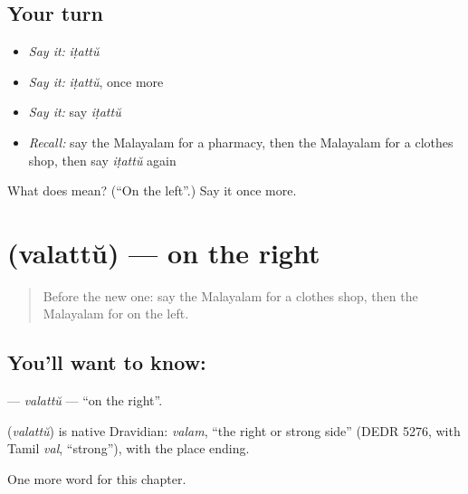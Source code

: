 \subsection*{Your turn}
\begin{itemize}
\raggedright
  \item \emph{Say it:} \emph{iṭattŭ}
  \item \emph{Say it:} \emph{iṭattŭ}, once more
  \item \emph{Say it:} say \emph{iṭattŭ}
  \item \emph{Recall:} say the Malayalam for a pharmacy, then the Malayalam for a clothes shop, then say \emph{iṭattŭ} again
\end{itemize}

\begin{tcolorbox}[breakable,colback=teal!4,colframe=teal!35!black,title={Before you move on}]
What does  mean? (\textquotedblleft{}On the left\textquotedblright{}.) Say it once more.
\end{tcolorbox}
\section[\texorpdfstring{\ml{വലത്ത്} (valattŭ)}{വലത്ത് (valattŭ)}]{ (valattŭ) — on the right}

\label{lesson:ML-C197-valattu}



\begin{quote}
Before the new one: say the Malayalam for a clothes shop, then the Malayalam for on the left.
\end{quote}

\subsection*{You'll want to know: }
\textbf{} — \emph{valattŭ} — \textquotedblleft{}on the right\textquotedblright{}.

\begin{cousinweb}
\textbf{} (\emph{valattŭ}) is native Dravidian: \emph{valam}, \textquotedblleft{}the right or strong side\textquotedblright{} (DEDR 5276, with Tamil \emph{val}, \textquotedblleft{}strong\textquotedblright{}), with the place ending.
\end{cousinweb}

\begin{grammarlens}[title={What you've built}]
One more word for this chapter.
\end{grammarlens}

